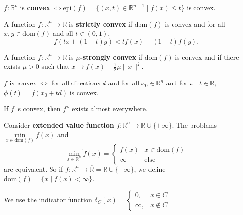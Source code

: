 \documentclass[english, 11pt]{article}
\begin{document}
  \begin{defn}[Convex]
  $f:\mathbb{R}^n$ is {\bf convex} $\iff \text{epi}(f) = \{(x,t) \in \mathbb{R}^{n+1} \mid f(x) \le t \}$ is convex.
  \end{defn}
  
  \begin{defn}
  A function $f : \mathbb{R}^n \to \mathbb{R}$ is {\bf strictly convex} if $\text{dom}(f)$ is convex and for all $x,y \in \text{dom}(f)$ and all $t \in (0,1)$,
\[
f(tx + (1-t) y) < t f(x) + (1-t) f(y).
\]
  \end{defn}
  
  
    \begin{defn}
  A function $f : \mathbb{R}^n \to \mathbb{R}$ is {\bf $\mu$-strongly convex} if $\text{dom}(f)$ is convex and if there exists $\mu>0$ such that $x \mapsto f(x) - \frac{1}{2} \mu \|x \|^2$.  \end{defn}
  
  \begin{rem}
  $f$ is convex $\iff$ for all directions $d$ and for all $x_0 \in \mathbb{R}^n$ and for all $t \in \mathbb{R}$, $\phi(t) = f(x_0 + t d)$ is convex.
  \end{rem}
  
  \begin{thrm}
  If $f$ is convex, then $f''$ exists almost everywhere.
  \end{thrm}
  
  \begin{rem}
  Consider {\bf extended value function} $f: \mathbb{R}^n \to \mathbb{R} \cup \{ \pm \infty \}$. The problems $\min \limits_{x \in \text{dom}(f)} f(x)$ and 
  \[
  \min \limits_{x \in \mathbb{R}^n} \tilde{f}(x) = \begin{cases} f(x) & x \in \text{dom}(f) \\ \infty & \text{else} \end{cases}
  \]
  are equivalent. So if $f:\mathbb{R}^n \to \overline{\mathbb{R}} = \mathbb{R} \cup \{ \pm \infty \}$, we define $\text{dom}(f) = \{x \mid f(x) < \infty \}$.
  \end{rem}
  
  \begin{defn}
  We use the indicator function $\delta_C(x) = \begin{cases} 0, & x \in C \\ \infty, & x \notin C \end{cases}$
  \end{defn}
  
\end{document}
